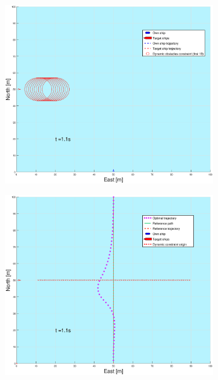 \begin{figure}[ht!] %
    \begin{subfigure}[b]{0.49\textwidth}
        \centering
        \includegraphics[width=\textwidth]{Images/Figures/enkel_SO/_Simple_1fig1_time=1}
    \end{subfigure}
    \hfill
    \begin{subfigure}[b]{0.499\textwidth}
        \centering
        \includegraphics[width=\textwidth]{Images/Figures/enkel_SO/_Simple_1fig999_time=1}

\end{subfigure}
\end{figure}
